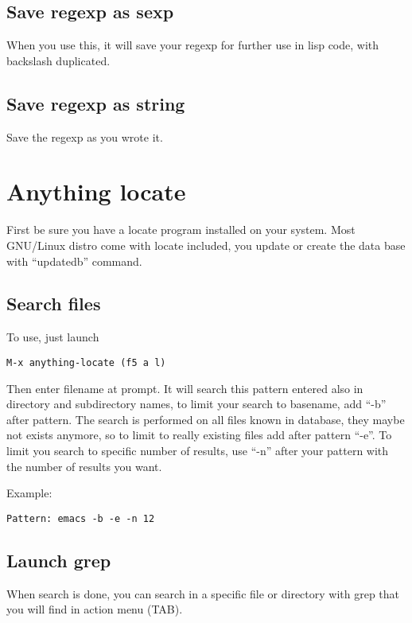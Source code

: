 \documentclass[a4paper,11pt]{article}
\begin{document}
\subsection{Save regexp as sexp}
\label{sec:save-regexp-as}
When you use this, it will save your regexp for further use in lisp code,
with backslash duplicated.

\subsection{Save regexp as string}
\label{sec:save-regexp-as-1}
Save the regexp as you wrote it.

\section{Anything locate}
\label{sec:anything-locate}
First be sure you have a locate program installed on your system.
Most GNU/Linux distro come with locate included, you update or create the data base with
``updatedb'' command.

\subsection{Search files}
\label{sec:search-files}

To use, just launch 
\begin{verbatim}
M-x anything-locate (f5 a l)
\end{verbatim}

Then enter filename at prompt.
It will search this pattern entered also in directory and subdirectory names, to limit your search to basename,
add ``-b'' after pattern.
The search is performed on all files known in database, they maybe not exists anymore, so to limit to
really existing files add after pattern ``-e''.
To limit you search to specific number of results, use ``-n'' after your pattern with the number of results
you want.

Example:
\begin{verbatim}
Pattern: emacs -b -e -n 12
\end{verbatim}

\subsection{Launch grep}
\label{sec:launch-grep}

When search is done, you can search in a specific file or directory with grep that you will find in action menu (TAB).\\
\end{document}
